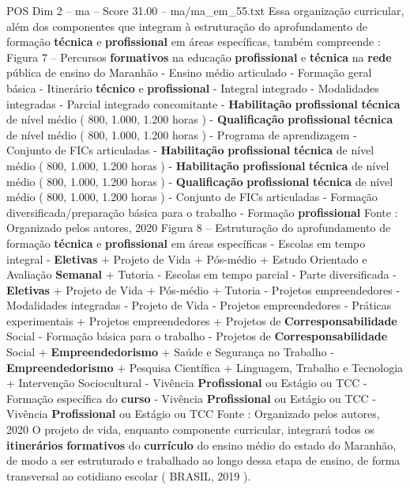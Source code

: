 \begin{textsample}{POS Dim 2 – ma – Score 31.00 – ma/ma\_em\_55.txt}
Essa organização curricular, além dos componentes que integram à estruturação do aprofundamento de formação \textbf{técnica} e \textbf{profissional} em áreas específicas, também compreende : Figura 7 – Percursos \textbf{formativos} na educação \textbf{profissional} e \textbf{técnica} na \textbf{rede} pública de ensino do Maranhão - Ensino médio articulado - Formação geral básica - Itinerário \textbf{técnico} e \textbf{profissional} - Integral integrado - Modalidades integradas - Parcial integrado concomitante - \textbf{Habilitação} \textbf{profissional} \textbf{técnica} de nível médio ( 800, 1.000, 1.200 horas ) - \textbf{Qualificação} \textbf{profissional} \textbf{técnica} de nível médio ( 800, 1.000, 1.200 horas ) - Programa de aprendizagem - Conjunto de FICs articuladas - \textbf{Habilitação} \textbf{profissional} \textbf{técnica} de nível médio ( 800, 1.000, 1.200 horas ) - \textbf{Habilitação} \textbf{profissional} \textbf{técnica} de nível médio ( 800, 1.000, 1.200 horas ) - \textbf{Qualificação} \textbf{profissional} \textbf{técnica} de nível médio ( 800, 1.000, 1.200 horas ) - Conjunto de FICs articuladas - Formação diversificada/preparação básica para o trabalho - Formação \textbf{profissional} Fonte : Organizado pelos autores, 2020 Figura 8 – Estruturação do aprofundamento de formação \textbf{técnica} e \textbf{profissional} em áreas específicas - Escolas em tempo integral - \textbf{Eletivas} + Projeto de Vida + Pós-médio + Estudo Orientado e Avaliação \textbf{Semanal} + Tutoria - Escolas em tempo parcial - Parte diversificada - \textbf{Eletivas} + Projeto de Vida + Pós-médio + Tutoria - Projetos empreendedores - Modalidades integradas - Projeto de Vida - Projetos empreendedores - Práticas experimentais + Projetos empreendedores + Projetos de \textbf{Corresponsabilidade} Social - Formação básica para o trabalho - Projetos de \textbf{Corresponsabilidade} Social + \textbf{Empreendedorismo} + Saúde e Segurança no Trabalho - \textbf{Empreendedorismo} + Pesquisa Científica + Linguagem, Trabalho e Tecnologia + Intervenção Sociocultural - Vivência \textbf{Profissional} ou Estágio ou TCC - Formação específica do \textbf{curso} - Vivência \textbf{Profissional} ou Estágio ou TCC - Vivência \textbf{Profissional} ou Estágio ou TCC Fonte : Organizado pelos autores, 2020 O projeto de vida, enquanto componente curricular, integrará todos os \textbf{itinerários} \textbf{formativos} do \textbf{currículo} do ensino médio do estado do Maranhão, de modo a ser estruturado e trabalhado ao longo dessa etapa de ensino, de forma transversal ao cotidiano escolar ( BRASIL, 2019 ).

\end{textsample}
